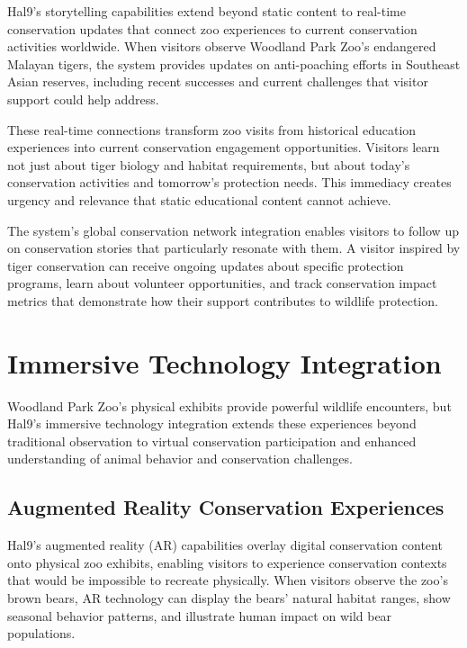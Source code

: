 \documentclass[
  Letterpaper,
]{scrbook}
\begin{document}
Hal9's storytelling capabilities extend beyond static content to
real-time conservation updates that connect zoo experiences to current
conservation activities worldwide. When visitors observe Woodland Park
Zoo's endangered Malayan tigers, the system provides updates on
anti-poaching efforts in Southeast Asian reserves, including recent
successes and current challenges that visitor support could help
address.

These real-time connections transform zoo visits from historical
education experiences into current conservation engagement
opportunities. Visitors learn not just about tiger biology and habitat
requirements, but about today's conservation activities and tomorrow's
protection needs. This immediacy creates urgency and relevance that
static educational content cannot achieve.

The system's global conservation network integration enables visitors to
follow up on conservation stories that particularly resonate with them.
A visitor inspired by tiger conservation can receive ongoing updates
about specific protection programs, learn about volunteer opportunities,
and track conservation impact metrics that demonstrate how their support
contributes to wildlife protection.

\section{Immersive Technology
Integration}\label{immersive-technology-integration}

Woodland Park Zoo's physical exhibits provide powerful wildlife
encounters, but Hal9's immersive technology integration extends these
experiences beyond traditional observation to virtual conservation
participation and enhanced understanding of animal behavior and
conservation challenges.

\subsection{Augmented Reality Conservation
Experiences}\label{augmented-reality-conservation-experiences}

Hal9's augmented reality (AR) capabilities overlay digital conservation
content onto physical zoo exhibits, enabling visitors to experience
conservation contexts that would be impossible to recreate physically.
When visitors observe the zoo's brown bears, AR technology can display
the bears' natural habitat ranges, show seasonal behavior patterns, and
illustrate human impact on wild bear populations.
\end{document}
